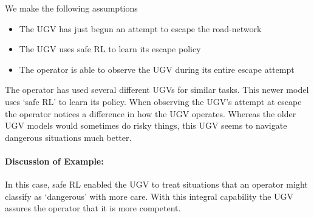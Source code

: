We make the following assumptions

\begin{itemize}
    \item The UGV has just begun an attempt to escape the road-network
    \item The UGV uses safe RL to learn its escape policy
    \item The operator is able to observe the UGV during its entire escape attempt
\end{itemize}

The operator has used several different UGVs for similar tasks. This newer model uses `safe RL' to learn its policy. When observing the UGV's attempt at escape the operator notices a difference in how the UGV operates. Whereas the older UGV models would sometimes do risky things, this UGV seems to navigate dangerous situations much better. 

\paragraph{\textbf{Discussion of Example:}} In this case, safe RL enabled the UGV to treat situations that an operator might classify as `dangerous' with more care. With this integral capability the UGV assures the operator that it is more competent.
